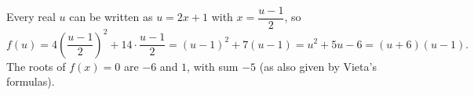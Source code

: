 Every real $u$ can be written as $u=2x+1$ with $x=\dfrac{u-1}{2}$, so
\[f(u)=4\left(\dfrac{u-1}{2}\right)^2+14\cdot\dfrac{u-1}{2}=(u-1)^2+7(u-1)=u^2+5u-6=(u+6)(u-1).\]
The roots of $f(x)=0$ are $-6$ and $1$, with sum $\boxed{-5}$ (as also given by Vieta's formulas).
